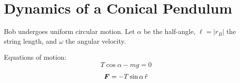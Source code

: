 \section{Dynamics of a Conical Pendulum}

\begin{example}
Bob undergoes uniform circular motion. Let $\alpha$ be the half-angle, $\ell = |r_B|$ the string length, and $\omega$ the angular velocity.

Equations of motion:
\[
    T\cos\alpha - mg = 0
\]
\[
    \vect{F} = -T\sin\alpha\,\hat{r}
\]
\end{example}
